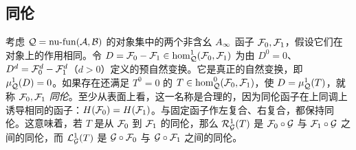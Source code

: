 \clearpage
\subsection{同伦}\label{sec:1h}
\begin{definition*}
考虑 $\Q=\nufun(\A,\B)$ 的对象集中的两个非含幺 $\Ai$ 函子 $\F_0,\F_1$，假设它们在对象上的作用相同。令 $D=\F_0-\F_1\in\hom^1_{\Q}(\F_0,\F_1)$ 为由 $D^0=0$、$D^d=\F_0^d-\F_1^d$（$d>0$）定义的预自然变换。它是真正的自然变换，即 $\mu^1_{\Q}(D)=0$。如果存在还满足 $T^0=0$ 的 $T\in\hom^0_{\Q}(\F_0,\F_1)$，使 $D=\mu^1_{\Q}(T)$，就称 $\F_0,\F_1$ \emph{同伦}。至少从表面上看，这一名称是合理的，因为同伦函子在上同调上诱导相同的函子：$H(\F_0)=H(\F_1)$。与固定函子作左复合、右复合，都保持同伦。这意味着，若 $T$ 是从 $\F_0$ 到 $\F_1$ 的同伦，那么 $\RG^1_{\G}(T)$ 是 $\F_0\circ\G$ 与 $\F_1\circ\G$ 之间的同伦，而 $\LG^1_{\G}(T)$ 是 $\G\circ\F_0$ 与 $\G\circ\F_1$ 之间的同伦。
\end{definition*}


